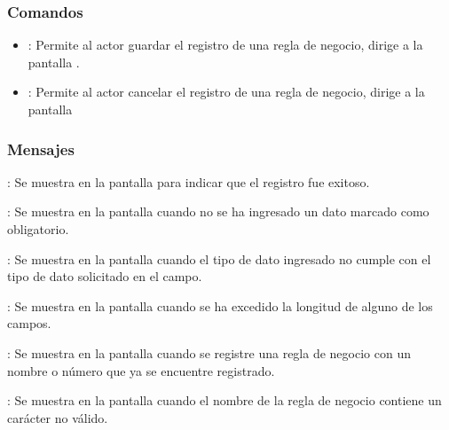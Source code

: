 \subsubsection{Comandos}
\begin{itemize}
	\item {}: Permite al actor guardar el registro de una regla de negocio, dirige a la pantalla .
	\item {}: Permite al actor cancelar el registro de una regla de negocio, dirige a la pantalla 
\end{itemize}

\subsubsection{Mensajes}

\begin{Citemize}
	\item {}: Se muestra en la pantalla  para indicar que el registro fue exitoso.
	\item {}: Se muestra en la pantalla  cuando no se ha ingresado un dato marcado como obligatorio.
	\item {}: Se muestra en la pantalla  cuando el tipo de dato ingresado no cumple con el tipo de dato solicitado en el campo.
	\item {}: Se muestra en la pantalla  cuando se ha excedido la longitud de alguno de los campos.
	\item {}: Se muestra en la pantalla  cuando se registre una regla de negocio con un nombre o número que ya se encuentre registrado.
	\item {}: Se muestra en la pantalla  cuando el nombre de la regla de negocio contiene un carácter no válido.
\end{Citemize}
